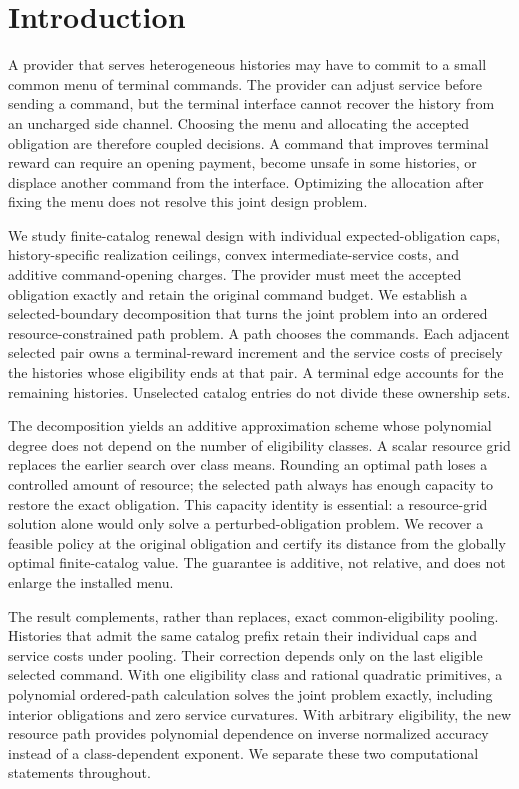 \section{Introduction}
A provider that serves heterogeneous histories may have to commit to a small common menu of terminal commands. The provider can adjust service before sending a command, but the terminal interface cannot recover the history from an uncharged side channel. Choosing the menu and allocating the accepted obligation are therefore coupled decisions. A command that improves terminal reward can require an opening payment, become unsafe in some histories, or displace another command from the interface. Optimizing the allocation after fixing the menu does not resolve this joint design problem.

We study finite-catalog renewal design with individual expected-obligation caps, history-specific realization ceilings, convex intermediate-service costs, and additive command-opening charges. The provider must meet the accepted obligation exactly and retain the original command budget. We establish a selected-boundary decomposition that turns the joint problem into an ordered resource-constrained path problem. A path chooses the commands. Each adjacent selected pair owns a terminal-reward increment and the service costs of precisely the histories whose eligibility ends at that pair. A terminal edge accounts for the remaining histories. Unselected catalog entries do not divide these ownership sets.

The decomposition yields an additive approximation scheme whose polynomial degree does not depend on the number of eligibility classes. A scalar resource grid replaces the earlier search over class means. Rounding an optimal path loses a controlled amount of resource; the selected path always has enough capacity to restore the exact obligation. This capacity identity is essential: a resource-grid solution alone would only solve a perturbed-obligation problem. We recover a feasible policy at the original obligation and certify its distance from the globally optimal finite-catalog value. The guarantee is additive, not relative, and does not enlarge the installed menu.

The result complements, rather than replaces, exact common-eligibility pooling. Histories that admit the same catalog prefix retain their individual caps and service costs under pooling. Their correction depends only on the last eligible selected command. With one eligibility class and rational quadratic primitives, a polynomial ordered-path calculation solves the joint problem exactly, including interior obligations and zero service curvatures. With arbitrary eligibility, the new resource path provides polynomial dependence on inverse normalized accuracy instead of a class-dependent exponent. We separate these two computational statements throughout.

